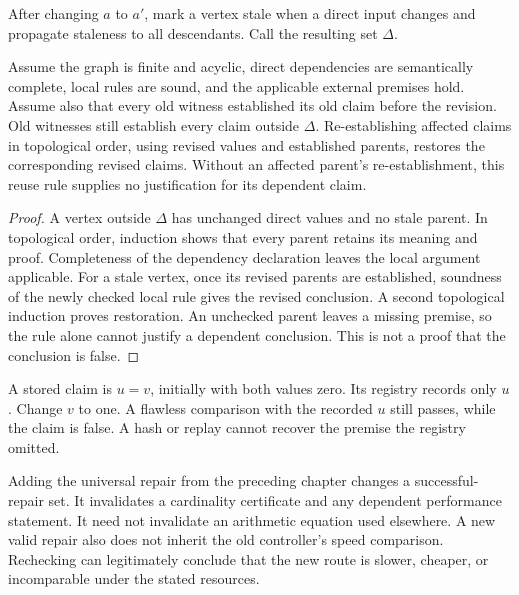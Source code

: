 After changing $a$ to $a'$, mark a vertex stale when a direct input changes and propagate staleness to all descendants. Call the resulting set $\Delta$.

\begin{theorem}\label{r:dependencies}
Assume the graph is finite and acyclic, direct dependencies are semantically complete, local rules are sound, and the applicable external premises hold. Assume also that every old witness established its old claim before the revision. Old witnesses still establish every claim outside $\Delta$. Re-establishing affected claims in topological order, using revised values and established parents, restores the corresponding revised claims. Without an affected parent's re-establishment, this reuse rule supplies no justification for its dependent claim.
\end{theorem}
\begin{proof}
A vertex outside $\Delta$ has unchanged direct values and no stale parent. In topological order, induction shows that every parent retains its meaning and proof. Completeness of the dependency declaration leaves the local argument applicable. For a stale vertex, once its revised parents are established, soundness of the newly checked local rule gives the revised conclusion. A second topological induction proves restoration. An unchecked parent leaves a missing premise, so the rule alone cannot justify a dependent conclusion. This is not a proof that the conclusion is false.
\end{proof}

\begin{counterexample}\label{ce:dependency}
A stored claim is $u=v$, initially with both values zero. Its registry records only $u$. Change $v$ to one. A flawless comparison with the recorded $u$ still passes, while the claim is false. A hash or replay cannot recover the premise the registry omitted.
\end{counterexample}

Adding the universal repair from the preceding chapter changes a successful-repair set. It invalidates a cardinality certificate and any dependent performance statement. It need not invalidate an arithmetic equation used elsewhere. A new valid repair also does not inherit the old controller's speed comparison. Rechecking can legitimately conclude that the new route is slower, cheaper, or incomparable under the stated resources.

